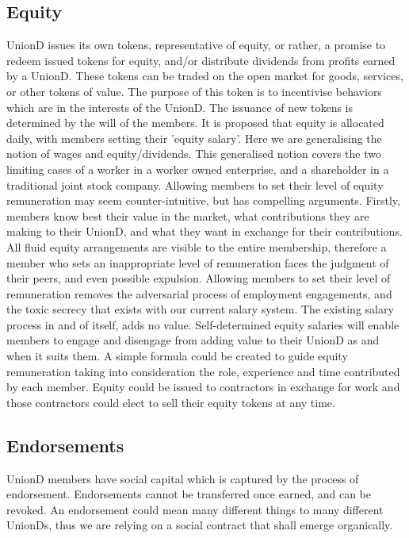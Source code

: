 \documentclass[12pt,twocolumn]{article}
\begin{document}
\subsection{Equity}

UnionD issues its own tokens, representative of equity, or rather, a promise to redeem issued tokens for equity, and/or distribute dividends from profits earned by a UnionD. These tokens can be traded on the open market for goods, services, or other tokens of value. The purpose of this token is to incentivise behaviors which are in the interests of the UnionD. The issuance of new tokens is determined by the will of the members. It is proposed that equity is allocated daily, with members setting their 'equity salary'. Here we are generalising the notion of wages and equity/dividends. This generalised notion covers the two limiting cases of a worker in a worker owned enterprise, and a shareholder in a traditional joint stock company. Allowing members to set their level of equity remuneration may seem counter-intuitive, but has compelling arguments. Firstly, members know best their value in the market, what contributions they are making to their UnionD, and what they want in exchange for their contributions. All fluid equity arrangements are visible to the entire membership, therefore a member who sets an inappropriate level of remuneration faces the judgment of their peers, and even possible expulsion. Allowing members to set their level of remuneration removes the adversarial process of employment engagements, and the toxic secrecy that exists with our current salary system.  The existing salary process in and of itself, adds no value. Self-determined equity salaries will enable members to engage and disengage from adding value to their UnionD as and when it suits them. A simple formula could be created to guide equity remuneration taking into consideration the role, experience and time contributed by each member. Equity could be issued to contractors in exchange for work and those contractors could elect to sell their equity tokens at any time.

\subsection{Endorsements}

UnionD members have social capital which is captured by the process of endorsement. Endorsements cannot be transferred once earned, and can be revoked. An endorsement could mean many different things to many different UnionDs, thus we are relying on a social contract that shall emerge organically.
\end{document}
